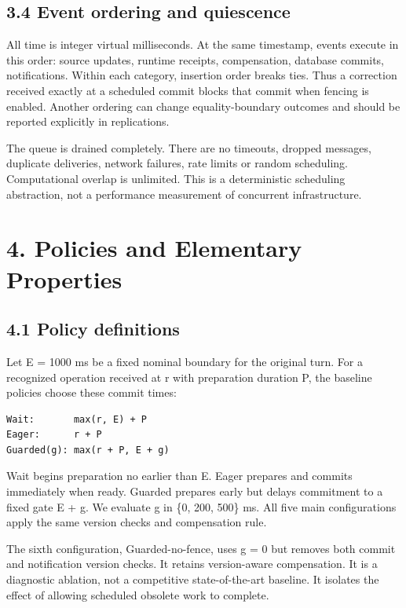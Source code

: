 \documentclass[10pt]{article}
\begin{document}
\subsection*{3.4 Event ordering and quiescence}

All time is integer virtual milliseconds. At the same timestamp, events execute in this order: source updates, runtime receipts, compensation, database commits, notifications. Within each category, insertion order breaks ties. Thus a correction received exactly at a scheduled commit blocks that commit when fencing is enabled. Another ordering can change equality-boundary outcomes and should be reported explicitly in replications.


The queue is drained completely. There are no timeouts, dropped messages, duplicate deliveries, network failures, rate limits or random scheduling. Computational overlap is unlimited. This is a deterministic scheduling abstraction, not a performance measurement of concurrent infrastructure.


\section*{4. Policies and Elementary Properties}

\subsection*{4.1 Policy definitions}

Let E = 1000 ms be a fixed nominal boundary for the original turn. For a recognized operation received at r with preparation duration P, the baseline policies choose these commit times:


\begin{lstlisting}
Wait:       max(r, E) + P
Eager:      r + P
Guarded(g): max(r + P, E + g)
\end{lstlisting}

Wait begins preparation no earlier than E. Eager prepares and commits immediately when ready. Guarded prepares early but delays commitment to a fixed gate E + g. We evaluate g in \{0, 200, 500\} ms. All five main configurations apply the same version checks and compensation rule.


The sixth configuration, Guarded-no-fence, uses g = 0 but removes both commit and notification version checks. It retains version-aware compensation. It is a diagnostic ablation, not a competitive state-of-the-art baseline. It isolates the effect of allowing scheduled obsolete work to complete.
\end{document}

